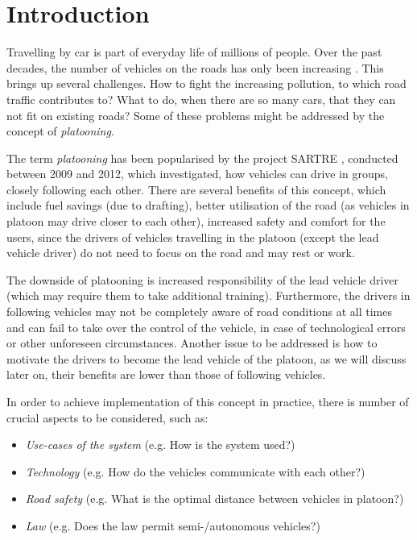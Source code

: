 \section{Introduction}
% 
Travelling by car is part of everyday life of millions of people. Over the past decades, the number of vehicles on the roads has only been increasing \cite{Tencer2011NumberWheels}. This brings up several challenges. How to fight the increasing pollution, to which road traffic contributes to? What to do, when there are so many cars, that they can not fit on existing roads? Some of these problems might be addressed by the concept of \emph{platooning}.\par
% 
The term \emph{platooning} has been popularised by the project SARTRE \cite{Chan2012ProjectSARTRE}, conducted between 2009 and 2012, which investigated, how vehicles can drive in groups, closely following each other. There are several benefits of this concept, which include fuel savings (due to drafting\footnotemark), better utilisation of the road (as vehicles in platoon may drive closer to each other), increased safety and comfort for the users, since the drivers of vehicles travelling in the platoon (except the lead vehicle driver) do not need to focus on the road and may rest or work.\par
% 
% 
The downside of platooning is increased responsibility of the lead vehicle driver (which may require them to take additional training). Furthermore, the drivers in following vehicles may not be completely aware of road conditions at all times and can fail to take over the control of the vehicle, in case of technological errors or other unforeseen circumstances. Another issue to be addressed is how to motivate the drivers to become the lead vehicle of the platoon, as we will discuss later on, their benefits are lower than those of following vehicles.\par
% 
In order to achieve implementation of this concept in practice, there is number of crucial aspects to be considered, such as:
\begin{itemize}[noitemsep]
    \item \emph{Use-cases of the system} (e.g. How is the system used?)
    \item \emph{Technology} (e.g. How do the vehicles communicate with each other?)
    \item \emph{Road safety} (e.g. What is the optimal distance between vehicles in platoon?)
    \item \emph{Law} (e.g. Does the law permit semi-/autonomous vehicles?)
\end{itemize} \par
